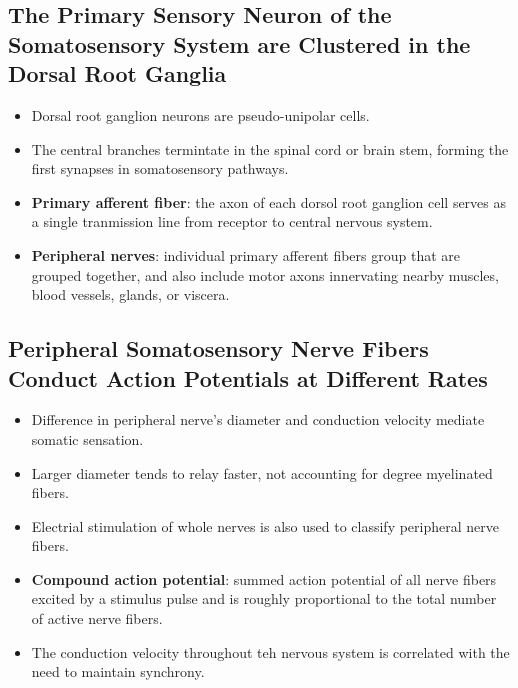 \documentclass[12pt,a4paper]{article}
\begin{document}
\subsection{The Primary Sensory Neuron of the Somatosensory System are Clustered in the Dorsal Root Ganglia}
\begin{itemize}
    \item Dorsal root ganglion neurons are pseudo-unipolar cells.
    \item The central branches termintate in the spinal cord or brain stem, forming the first synapses in somatosensory pathways.
    \item \textbf{Primary afferent fiber}: the axon of each dorsol root ganglion cell serves as a single tranmission line from receptor to central nervous system.
    \item \textbf{Peripheral nerves}: individual primary afferent fibers group that are grouped together, and also include motor axons innervating nearby muscles, blood vessels, glands, or viscera. 
\end{itemize}

\subsection{Peripheral Somatosensory Nerve Fibers Conduct Action Potentials at Different Rates}
\begin{itemize}
    \item Difference in peripheral nerve's diameter and conduction velocity mediate somatic sensation.
    \item Larger diameter tends to relay faster, not accounting for degree myelinated fibers.
    \item Electrial stimulation of whole nerves is also used to classify peripheral nerve fibers.
    \item \textbf{Compound action potential}: summed action potential of all nerve fibers excited by a stimulus pulse and is roughly proportional to the total number of active nerve fibers.
    \item The conduction velocity throughout teh nervous system is correlated with the need to maintain synchrony.
\end{itemize}
\end{document}
